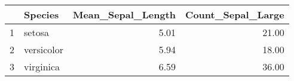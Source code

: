 \begin{table}[ht]
\centering
\begin{tabular}{rlrr}
  \hline
 & Species & Mean\_Sepal\_Length & Count\_Sepal\_Large \\ 
  \hline
1 & setosa & 5.01 & 21.00 \\ 
  2 & versicolor & 5.94 & 18.00 \\ 
  3 & virginica & 6.59 & 36.00 \\ 
   \hline
\end{tabular}
\end{table}

